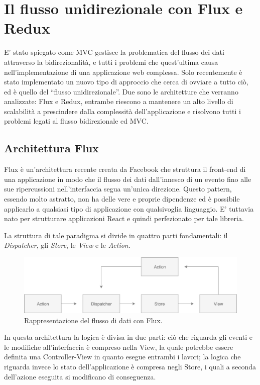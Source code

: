 \chapter{Il flusso unidirezionale con Flux e Redux}
E' stato spiegato come MVC gestisce la problematica del flusso dei dati attraverso la bidirezionalità, e tutti i problemi che quest'ultima causa nell'implementazione di una applicazione web complessa. Solo recentemente è stato implementato un nuovo tipo di approccio che cerca di ovviare a tutto ciò, ed è quello del “flusso unidirezionale”. Due sono le architetture che verranno analizzate: Flux e Redux, entrambe riescono a mantenere un alto livello di scalabilità a prescindere dalla complessità dell'applicazione e risolvono tutti i problemi legati al flusso bidirezionale ed MVC.

\section{Architettura Flux}
\label{FluxArchitecture}
Flux è un'architettura recente creata da Facebook che struttura il front-end di una applicazione in modo che il flusso dei dati dall'innesco di un evento fino alle sue ripercussioni nell'interfaccia segua un'unica direzione.
Questo pattern, essendo molto astratto, non ha delle vere e proprie dipendenze ed è possibile applicarlo a qualsiasi tipo di applicazione con qualsivoglia linguaggio. E' tuttavia nato per strutturare applicazioni React e quindi perfezionato per tale libreria.

La struttura di tale paradigma si divide in quattro parti fondamentali: il \textit{Dispatcher}, gli \textit{Store}, le \textit{View} e le \textit{Action}.

\begin{figure}[h]
\centering
\vspace*{0.5cm} 
\includegraphics[width=14cm]{./images/FluxWorkflow}
\caption{Rappresentazione del flusso di dati con Flux.}
\label{FluxWorkflow}
\vspace*{0.5cm} 
\end{figure}

\noindent
In questa architettura la logica è divisa in due parti: ciò che riguarda gli eventi e le modifiche all'interfaccia è compreso nella View, la quale potrebbe essere definita una Controller-View in quanto esegue entrambi i lavori; la logica che riguarda invece lo stato dell'applicazione è compresa negli Store, i quali a seconda dell'azione eseguita si modificano di conseguenza.

